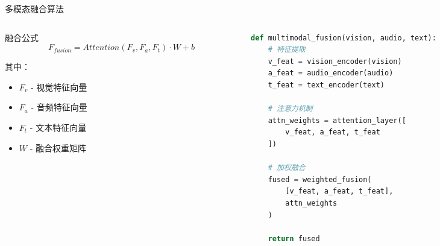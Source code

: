 \documentclass[aspectratio=169,12pt]{beamer}
\begin{document}
\begin{frame}[fragile]{多模态融合算法}
    \begin{columns}
        \begin{column}{0.5\textwidth}
            \begin{block}{融合公式}
                $$F_{fusion} = Attention(F_v, F_a, F_t) \cdot W + b$$
                
                其中：
                \begin{itemize}
                    \item $F_v$ - 视觉特征向量
                    \item $F_a$ - 音频特征向量  
                    \item $F_t$ - 文本特征向量
                    \item $W$ - 融合权重矩阵
                \end{itemize}
            \end{block}
        \end{column}
        \begin{column}{0.5\textwidth}
            \begin{lstlisting}[language=Python, caption=融合算法核心代码]
def multimodal_fusion(vision, audio, text):
    # 特征提取
    v_feat = vision_encoder(vision)
    a_feat = audio_encoder(audio)
    t_feat = text_encoder(text)
    
    # 注意力机制
    attn_weights = attention_layer([
        v_feat, a_feat, t_feat
    ])
    
    # 加权融合
    fused = weighted_fusion(
        [v_feat, a_feat, t_feat], 
        attn_weights
    )
    
    return fused
            \end{lstlisting}
        \end{column}
    \end{columns}
\end{frame}
\end{document}
